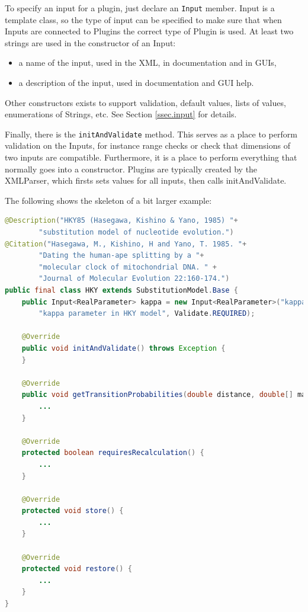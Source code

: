 \documentclass{article}
\begin{document}
To specify an input for a plugin, just declare an {\tt Input} member. Input is a template
class, so the type of input can be specified to make sure that when Inputs are connected
to Plugins the correct type of Plugin is used. At least two strings are used in the 
constructor of an Input:
\begin{itemize}
\item a name of the input, used in the XML, in documentation and in GUIs,
\item a description of the input, used in documentation and GUI help.
\end{itemize}
Other constructors exists to support validation, default values, lists of values,
enumerations of Strings, etc. See Section \ref{ssec.input} for details.

Finally, there is the {\tt initAndValidate} method. This serves as a place to perform
validation on the Inputs, for instance range checks or check that dimensions of two
inputs are compatible. Furthermore, it is a place to perform everything that normally
goes into a constructor. Plugins are typically created by the XMLParser, which firsts
sets values for all inputs, then calls initAndValidate.

The following shows the skeleton of a bit larger example:

{\color{blue}\begin{lstlisting}[language=java]
@Description("HKY85 (Hasegawa, Kishino & Yano, 1985) "+
        "substitution model of nucleotide evolution.")
@Citation("Hasegawa, M., Kishino, H and Yano, T. 1985. "+
        "Dating the human-ape splitting by a "+ 
        "molecular clock of mitochondrial DNA. " +
        "Journal of Molecular Evolution 22:160-174.")
public final class HKY extends SubstitutionModel.Base {
    public Input<RealParameter> kappa = new Input<RealParameter>("kappa", 
        "kappa parameter in HKY model", Validate.REQUIRED);

    @Override
    public void initAndValidate() throws Exception {
    }

    @Override
    public void getTransitionProbabilities(double distance, double[] matrix) {
        ...
    }

    @Override
    protected boolean requiresRecalculation() {
        ...
    }

    @Override
    protected void store() {
        ...
    }

    @Override
    protected void restore() {
        ...
    }
}
\end{lstlisting}}
\end{document}

